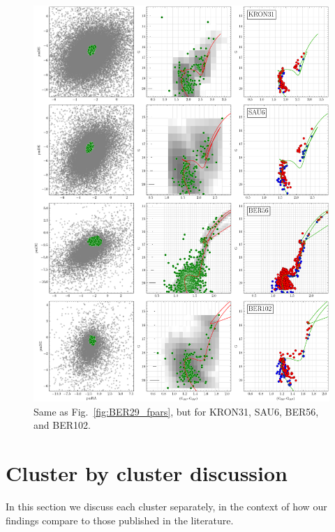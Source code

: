 \documentclass{aa}
\begin{document}
\begin{appendix}
 \begin{figure}
  \centering
  \includegraphics[height=.95\textheight]{figs/20_fpars.png}
  \caption{Same as Fig.~\ref{fig:BER29_fpars}, but  for KRON31, SAU6, BER56, and BER102.}
  \label{fig:20fpars}
 \end{figure}


\FloatBarrier
\section{Cluster by cluster discussion}
 \label{app:indiv_clusters}

  In this section we discuss each cluster separately, in the context of how our
  findings compare to those published in the literature.\\


\end{appendix}
\end{document}

